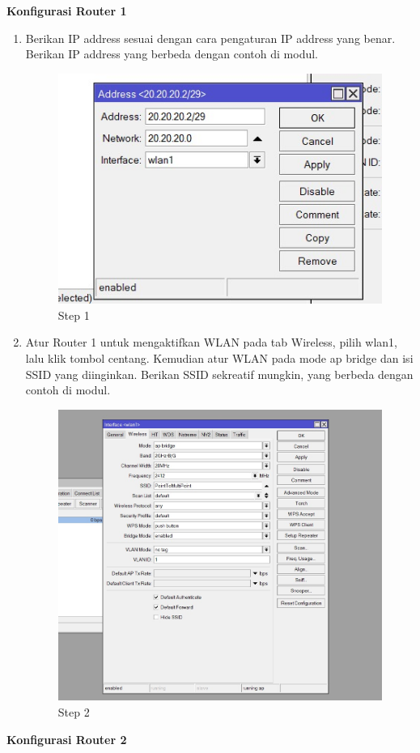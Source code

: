 \begin{center} 
	\textbf{Konfigurasi Router 1}
\end{center}

\begin{enumerate}
	\item Berikan IP address sesuai dengan cara pengaturan IP address yang benar. Berikan IP address
	yang berbeda dengan contoh di modul.	
	\begin{figure}[H]
		\centering
		\includegraphics[width=0.5\linewidth]{P1/img/per2pc1step1.jpg}
		\caption{Step 1}
		\label{fig:gambar10}
	\end{figure}

	\item Atur Router 1 untuk mengaktifkan WLAN pada tab Wireless, pilih wlan1, lalu klik tombol centang. Kemudian atur WLAN pada mode ap bridge dan isi SSID yang diinginkan. Berikan SSID
	sekreatif mungkin, yang berbeda dengan contoh di modul.
	\begin{figure}[H]
		\centering
		\includegraphics[width=0.5\linewidth]{P1/img/per2pc1step2.jpg}
		\caption{Step 2}
		\label{fig:gambar11}
	\end{figure}

\end{enumerate}

\begin{center} 
	\textbf{Konfigurasi Router 2}
\end{center}

